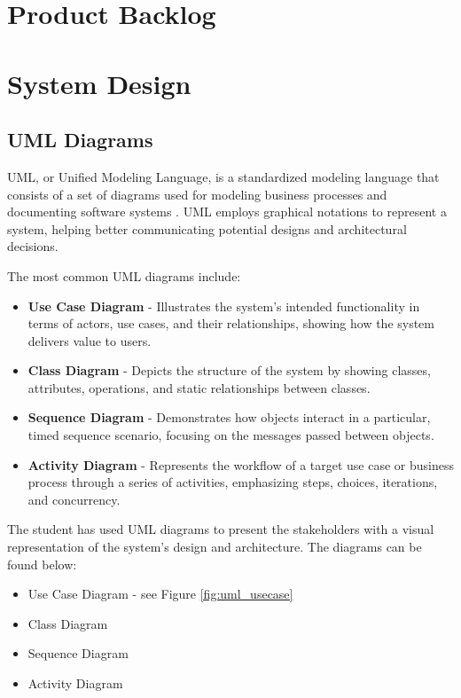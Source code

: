\section{Product Backlog}

\section{System Design}

\subsection{UML Diagrams}

UML, or Unified Modeling Language, is a standardized modeling language that consists of a set of diagrams used for modeling business processes and documenting software systems \parencite{uml}. UML employs graphical notations to represent a system, helping better communicating potential designs and architectural decisions.

The most common UML diagrams include:
\begin{itemize}
    \item \textbf{Use Case Diagram} - Illustrates the system's intended functionality in terms of actors, use cases, and their relationships, showing how the system delivers value to users.
    \item \textbf{Class Diagram} - Depicts the structure of the system by showing classes, attributes, operations, and static relationships between classes.
    \item \textbf{Sequence Diagram} - Demonstrates how objects interact in a particular, timed sequence scenario, focusing on the messages passed between objects.
    \item \textbf{Activity Diagram} - Represents the workflow of a target use case or business process through a series of activities, emphasizing steps, choices, iterations, and concurrency.
\end{itemize}

The student has used UML diagrams to present the stakeholders with a visual representation of the system's design and architecture. The diagrams can be found below:

\begin{itemize}
    \item Use Case Diagram - see Figure \ref{fig:uml_usecase}
    \item Class Diagram
    \item Sequence Diagram
    \item Activity Diagram
\end{itemize}

